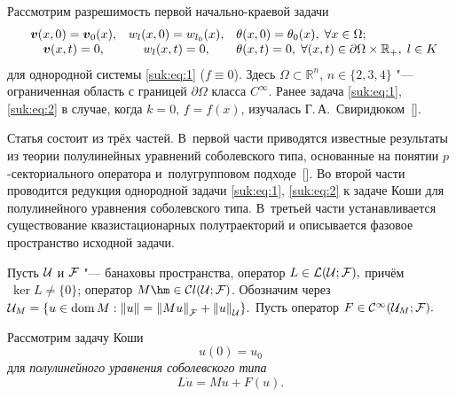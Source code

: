  Рассмотрим разрешимость первой начально-краевой задачи
\begin{equation}
\begin{array}{ccll}
 \boldsymbol{v}(x,0)=\boldsymbol{v}_0(x), &  { w}_l(x,0)={ w}_{l_0}(x), &  \theta (x,0)={\theta }_0(x), \;  \forall x \in \Omega ;\\
\boldsymbol{v}(x,t)=0,  &  w_l(x,t)=0,&   \theta (x,t)=0, \; \forall (x,t) \in \partial \Omega \times {\mathbb R}_{+},\; l\in K   \hspace{-2mm}
\end{array} 
\label{suk:eq:2}
\end{equation}
для однородной системы \eqref{suk:eq:1} ($f \equiv 0$).
Здесь $\Omega \subset {\mathbb R}^n$, $n\in \{2, 3, 4\}$ "---  ограниченная область с границей $\partial \Omega$ класса $C^{\infty}.$ 
Ранее задача \eqref{suk:eq:1}, \eqref{suk:eq:2} в случае, когда $k=0$, $f=f(x)$,  изучалась Г.\,А.~Свиридюком~[].%

Статья состоит из трёх частей. 
В~первой части приводятся известные результаты из теории полулинейных уравнений соболевского типа, основанные на понятии $p$-секториального оператора и~полугрупповом подходе~[]. 
Во второй части проводится редукция однородной задачи \eqref{suk:eq:1}, \eqref{suk:eq:2} к задаче Коши для полулинейного уравнения соболевского типа. 
В~третьей части устанавливается существование квазистационарных полутраекторий и описывается фазовое пространство исходной задачи.

\smallskip

Пусть ${\cal U}$ и ${\cal F}$  "---  банаховы пространства,
оператор  $L \in {\cal L}({\cal U}; {\cal F}),$
причём $~\ker L \ne \{ 0 \}$; оператор  $M \hm \in {\cal C}l({\cal U};{\cal F})$.  
Обозначим через ${\cal U}_M= \{ u \in {\rm dom\,} M: \| u \| = {\|M u \|}_{\cal F}+ {\| u \|}_{\cal U}\}.$ 
Пусть оператор $F \in {\cal C}^{\infty }({\cal U}_M;{\cal F}).$

Рассмотрим задачу Коши
\begin{equation}
u(0)=u_0 
\label{suk:eq:3}
\end{equation}
для {\it полулинейного уравнения соболевского типа}
\begin{equation}
L \dot u = M u + F(u).
\label{suk:eq:4}
\end{equation}

